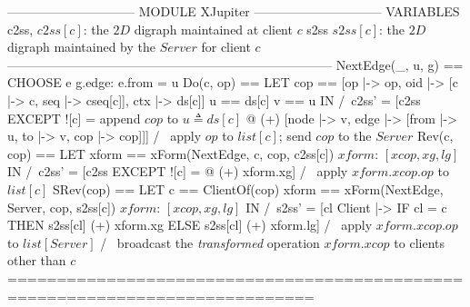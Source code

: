 \documentclass{article}
\begin{document}
\begin{tla}
------------------------------ MODULE XJupiter ------------------------------
VARIABLES c2ss, \* $c2ss[c]$: the $2D$ digraph maintained at client $c$ 
          s2ss  \* $s2ss[c]$: the $2D$ digraph maintained by the $Server$ for client $c$
-----------------------------------------------------------------------------
NextEdge(_, u, g) == CHOOSE e \in g.edge: e.from = u
Do(c, op) == LET cop == [op |-> op, oid |-> [c |-> c, seq |-> cseq[c]], ctx |-> ds[c]]
                   u == ds[c]    v == u 
             IN  /\ c2ss' = [c2ss EXCEPT ![c] = \* append $cop$ to $u \triangleq ds[c]$
                    @ (+) [node |-> {v}, edge |-> {[from |-> u, to |-> v, cop |-> cop]}]]
                 /\ \* apply $op$ to $list[c]$; send $cop$ to the $Server$
Rev(c, cop) == LET xform == xForm(NextEdge, c, cop, c2ss[c]) \* $xform$: $[xcop, xg, lg]$
               IN  /\ c2ss' = [c2ss EXCEPT ![c] = @ (+) xform.xg]
                   /\ \* apply $xform.xcop.op$ to $list[c]$
SRev(cop) == 
    LET c == ClientOf(cop)
    xform == xForm(NextEdge, Server, cop, s2ss[c]) \* $xform$: $[xcop, xg, lg]$
    IN  /\ s2ss' = [cl \in Client |-> IF cl = c THEN s2ss[cl] (+) xform.xg
                                                ELSE s2ss[cl] (+) xform.lg]
        /\ \* apply $xform.xcop.op$ to $list[Server]$
        /\ \* broadcast the \emph{transformed} operation $xform.xcop$ to clients other than $c$
=============================================================================
\end{tla}
\end{document}
